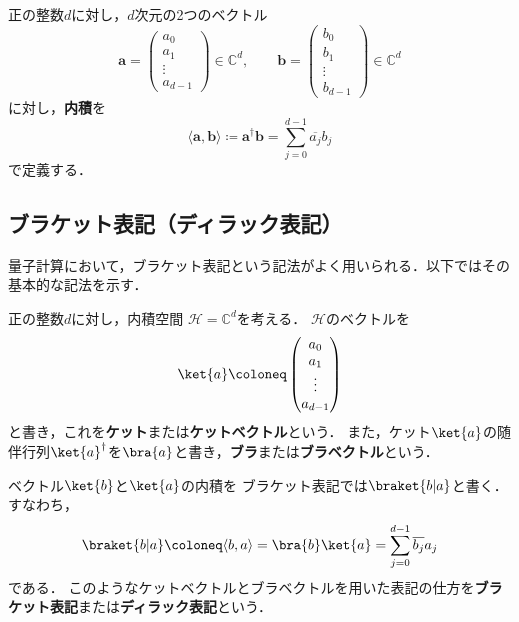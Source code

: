\begin{samepage}
\begin{defi}[内積]
正の整数$d$に対し，$d$次元の2つのベクトル
\begin{equation*}
  \bm{a}=\begin{pmatrix}a_0\\a_1\\\vdots\\a_{d-1}\end{pmatrix}
  \in\mathbb C^d,
  \qquad
  \bm{b}=\begin{pmatrix}b_0\\b_1\\\vdots\\b_{d-1}\end{pmatrix}
  \in\mathbb C^d
\end{equation*}
に対し，\textbf{内積}を
\begin{equation*}
  \langle \bm{a},\bm{b}\rangle\coloneq \bm{a}^{\dagger}\bm{b}
  =\sum_{j=0}^{d-1}\overline{a_j}b_j
\end{equation*}
で定義する．
\end{defi}
\end{samepage}


\subsection{ブラケット表記（ディラック表記）}

量子計算において，ブラケット表記という記法がよく用いられる．以下ではその基本的な記法を示す．

\begin{defi}
正の整数$d$に対し，内積空間
$\mathcal H=\mathbb C^d$を考える．
$\mathcal H$のベクトルを
\begin{equation*}
  \ket{a}
  \coloneq
  \begin{pmatrix}
    a_0\\a_1\\\vdots\\a_{d-1}
  \end{pmatrix}
\end{equation*}
と書き，これを\textbf{ケット}または\textbf{ケットベクトル}という．
また，ケット$\ket{a}$の随伴行列$\ket{a}^{\dagger}$を$\bra{a}$と書き，\textbf{ブラ}または\textbf{ブラベクトル}という．

ベクトル$\ket{b}$と$\ket{a}$の内積を
ブラケット表記では$\braket{b|a}$と書く．すなわち，
\begin{equation*}
  \braket{b|a}\coloneq\langle b,a\rangle
  =\bra{b}\ket{a}
  =\sum_{j=0}^{d-1}\overline{b_j}a_j
\end{equation*}
である．
このようなケットベクトルとブラベクトルを用いた表記の仕方を\textbf{ブラケット表記}または\textbf{ディラック表記}という．
\end{defi}

